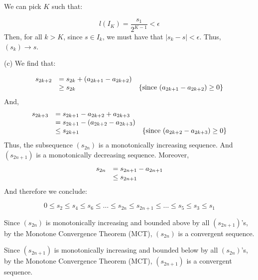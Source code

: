 \documentclass[10pt]{article}
\begin{document}
We can pick $\displaystyle K$ such that:


\begin{equation*}
l( I_{K}) =\frac{s_{1}}{2^{K-1}} < \epsilon 
\end{equation*}
Then, for all $\displaystyle k >K$, since $\displaystyle s \in I_{k}$, we must have that $\displaystyle |s_{k} -s|< \epsilon $. Thus, $\displaystyle ( s_{k})\rightarrow s$.



(c) We find that:


\begin{equation*}
\begin{array}{ c l c }
s_{2k+2} & =s_{2k} +( a_{2k+1} -a_{2k+2}) & \\
 & \geq s_{2k} & \left\{\text{since} \ ( a_{2k+1} -a_{2k+2}) \geq 0\right\}
\end{array}
\end{equation*}
And,
\begin{equation*}
\begin{array}{ c l c }
s_{2k+3} & =s_{2k+1} -a_{2k+2} +a_{2k+3} & \\
 & =s_{2k+1} -( a_{2k+2} -a_{2k+3}) & \\
 & \leq s_{2k+1} & \left\{\text{since} \ ( a_{2k+2} -a_{2k+3}) \geq 0\right\}
\end{array}
\end{equation*}
Thus, the subsequence $\displaystyle ( s_{2n})$ is a monotonically increasing sequence. And $\displaystyle ( s_{2n+1})$ is a monotonically decreasing sequence. Moreover,
\begin{equation*}
\begin{array}{ c l }
s_{2n} & =s_{2n+1} -a_{2n+1}\\
 & \leq s_{2n+1}
\end{array}
\end{equation*}
And therefore we conclude:


\begin{equation*}
0\leq s_{2} \leq s_{4} \leq s_{6} \leq \dotsc \leq s_{2n} \leq s_{2n+1} \leq \dotsc \leq s_{5} \leq s_{3} \leq s_{1}
\end{equation*}


Since $\displaystyle ( s_{2n})$ is monotonically increasing and bounded above by all $\displaystyle ( s_{2n+1})$'s, by the Monotone Convergence Theorem (MCT), $\displaystyle ( s_{2n})$ is a convergent sequence. 



Since $\displaystyle ( s_{2n+1})$ is monotonically increasing and bounded below by all $\displaystyle ( s_{2n})$'s, by the Monotone Convergence Theorem (MCT), $\displaystyle ( s_{2n+1})$ is a convergent sequence. 
\end{document}
